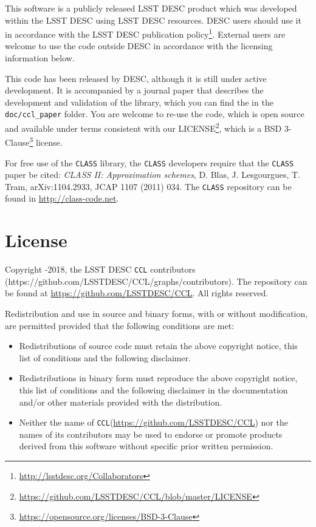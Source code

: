 \documentclass[\docopts]{\docclass}
\newcommand{\ccl}{{\tt CCL}\xspace}
\begin{document}
This software is a publicly released LSST DESC product which was developed within the LSST DESC using LSST DESC resources. DESC users should use it in accordance with the LSST DESC publication policy\footnote{\url{http://lsstdesc.org/Collaborators}}. External users are welcome to use the code outside DESC in accordance with the licensing information below.

This code has been released by DESC, although it is still under active development. It is accompanied by a journal paper that describes the development and validation of the library, which you can find the in the {\tt doc/ccl\_paper} folder. You are welcome to re-use the code, which is open source and available under terms consistent with our LICENSE\footnote{\url{https://github.com/LSSTDESC/CCL/blob/master/LICENSE}}, which is a BSD 3-Clause\footnote{\url{https://opensource.org/licenses/BSD-3-Clause}} license.

For free use of the {\tt CLASS} library, the {\tt CLASS} developers require that the {\tt CLASS} paper be cited: {\it  CLASS II: Approximation schemes}, D. Blas, J. Lesgourgues, T. Tram, arXiv:1104.2933, JCAP 1107 (2011) 034. The {\tt CLASS} repository can be found in \url{http://class-code.net}.

\section{License}
\label{sec:license}

Copyright -2018, the LSST DESC \ccl contributors (https://github.com/LSSTDESC/CCL/graphs/contributors). The repository can be found at \url{https://github.com/LSSTDESC/CCL}. All rights reserved.

Redistribution and use in source and binary forms, with or without
modification, are permitted provided that the following conditions are met:

\begin{itemize}
\item Redistributions of source code must retain the above copyright notice, this
  list of conditions and the following disclaimer.
\item Redistributions in binary form must reproduce the above copyright notice,
  this list of conditions and the following disclaimer in the documentation
  and/or other materials provided with the distribution.
\item Neither the name of \ccl (\url{https://github.com/LSSTDESC/CCL}) nor the names of its
  contributors may be used to endorse or promote products derived from
  this software without specific prior written permission.
\end{itemize}
\end{document}
